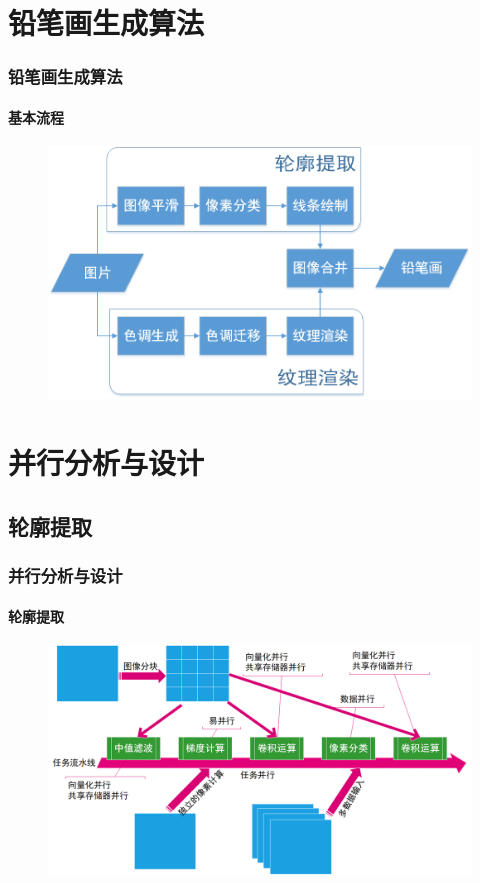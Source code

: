 \documentclass[aspectratio=43, xcolor=svgnames, t, 10pt]{beamer}
\begin{document}
\section{铅笔画生成算法}
\begin{frame}
  \frametitle{铅笔画生成算法}
  \framesubtitle{基本流程}
  \begin{figure}
    \centering
    \includegraphics[width=\linewidth]{./figure/alg_flowchart.png}
  \end{figure}
\end{frame}

\section{并行分析与设计}
\subsection{轮廓提取}
\begin{frame}
  \frametitle{并行分析与设计}
  \framesubtitle{轮廓提取}
  \begin{figure}
    \includegraphics[width=\linewidth]{./figure/ext_stroke_design.png}
  \end{figure}
\end{frame}
\end{document}
